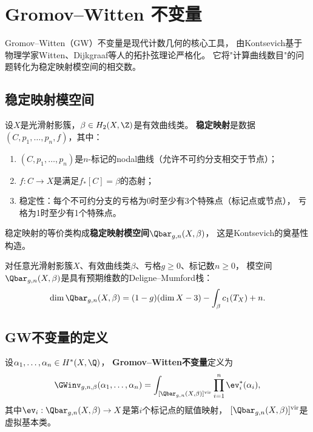 
\section{Gromov--Witten 不变量}\label{sec:gw}

Gromov--Witten（GW）不变量是现代计数几何的核心工具，
由Kontsevich基于物理学家Witten、Dijkgraaf等人的拓扑弦理论严格化。
它将"计算曲线数目"的问题转化为稳定映射模空间的相交数。

\subsection{稳定映射模空间}

\begin{definition}[稳定映射]\label{def:stablemap}
设$X$是光滑射影簇，$\beta \in H_2(X, \Z)$是有效曲线类。
\textbf{稳定映射}是数据$(C, p_1, \ldots, p_n, f)$，其中：
\begin{enumerate}[label=(\arabic*)]
\item $(C, p_1, \ldots, p_n)$是$n$-标记的nodal曲线（允许不可约分支相交于节点）；
\item $f: C \to X$是满足$f_*[C] = \beta$的态射；
\item 稳定性：每个不可约分支的亏格为0时至少有3个特殊点（标记点或节点），
亏格为1时至少有1个特殊点。
\end{enumerate}
\end{definition}

稳定映射的等价类构成\textbf{稳定映射模空间}$\Qbar_{g,n}(X, \beta)$，
这是Kontsevich的奠基性构造\cite{Kontsevich1995}。

\begin{theorem}[Kontsevich]\label{thm:konst}
对任意光滑射影簇$X$、有效曲线类$\beta$、亏格$g \geq 0$、标记数$n \geq 0$，
模空间$\Qbar_{g,n}(X, \beta)$是具有预期维数的Deligne--Mumford栈：
\[
\dim \Qbar_{g,n}(X, \beta) = (1-g)(\dim X - 3) - \int_\beta c_1(T_X) + n.
\]
\end{theorem}

\subsection{GW不变量的定义}

\begin{definition}\label{def:gw}
设$\alpha_1, \ldots, \alpha_n \in H^*(X, \Q)$，
\textbf{Gromov--Witten不变量}定义为
\[
\GWinv_{g,n,\beta}(\alpha_1, \ldots, \alpha_n)
= \int_{[\Qbar_{g,n}(X,\beta)]^{\mathrm{vir}}} \prod_{i=1}^n \ev_i^*(\alpha_i),
\]
其中$\ev_i: \Qbar_{g,n}(X,\beta) \to X$是第$i$个标记点的赋值映射，
$[\Qbar_{g,n}(X,\beta)]^{\mathrm{vir}}$是虚拟基本类。
\end{definition}

